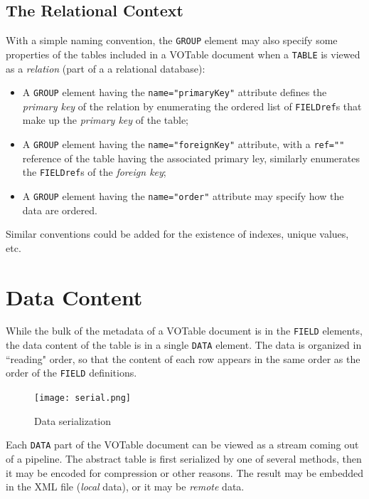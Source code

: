 \documentclass[11pt,a4paper]{ivoa}
\let\fg=\color
\def\elem#1{{\tt{\fg{DarkRed}#1}}}
\def\attrval#1#2{{\tt{\fg{DarkRed}#1}="{\fg{DarkPurple}#2}"}}
\begin{document}
\subsection{The Relational Context}
\label{sec:relation}

With a simple naming convention,
the \elem{GROUP} element may also specify some
properties of the tables included in a VOTable document
when a \elem{TABLE} is viewed as a {\em relation} (part of a
a relational database):

\begin{itemize}
\item   A \elem{GROUP} element having the \attrval{name}{primaryKey}
        attribute defines the {\em primary key} of the relation
        by enumerating the ordered list of \elem{FIELDref}s that
        make up the {\em primary key} of the table;
\item   A \elem{GROUP} element having the \attrval{name}{foreignKey}
        attribute, with a \attrval{ref}{{\rm\em table\_reference}}
        reference of the table having the associated primary ley,
        similarly enumerates the \elem{FIELDref}s of the
        {\em foreign key};
\item   A \elem{GROUP} element having the \attrval{name}{order}
        attribute may specify how the data are ordered.
\end{itemize}

\noindent Similar conventions could be added for
the existence of indexes, unique values, etc.

\section{Data Content}
\label{sec:data}

While the bulk of the metadata of a VOTable document is in the
{\elem{FIELD}} elements, the data content of the table is
in a single {\elem{DATA}} element.
The data is organized in ``reading" order, so that
the content of each row appears in the same order as the order of the
{\elem{FIELD}} definitions.

\label{Image1}
\begin{figure}[hbt]
\texttt{[image: serial.png]}
\caption{\label{fig:serialization}Data serialization}
\end{figure}

Each \elem{DATA} part of the VOTable document can be viewed as
a stream coming out of a pipeline.
The abstract table is first serialized by one of several
methods, then it may be encoded for compression or other reasons. The
result may be embedded in the XML file ({\it local} data), or it may
be {\it remote} data.
\end{document}
